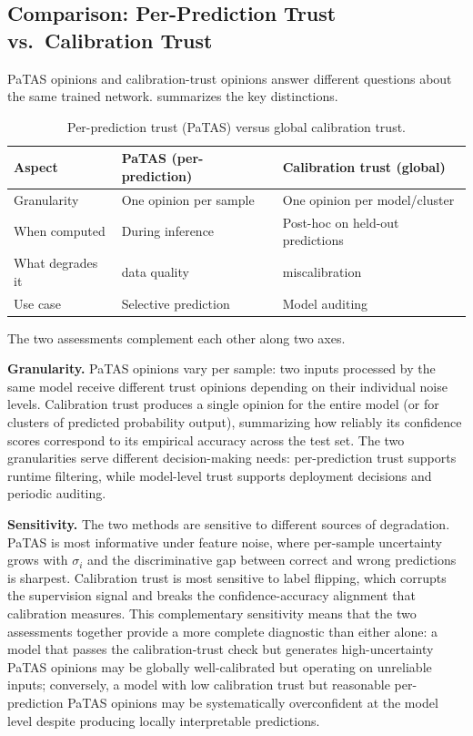 \subsection{Comparison: Per-Prediction Trust vs.\ Calibration Trust}
\label{sec:patas_vs_calibration}
\ac{PaTAS} opinions and calibration-trust opinions answer different questions about the same trained network.  summarizes the key distinctions.

\begin{table}[h]
\centering
\caption{Per-prediction trust (\ac{PaTAS}) versus global calibration trust.}
\label{tab:trust_comparison}
\begin{tabular}{lll}
\toprule
Aspect & \ac{PaTAS} (per-prediction) & Calibration trust (global) \\
\midrule
Granularity       & One opinion per sample      & One opinion per model/cluster \\
When computed     & During inference            & Post-hoc on held-out predictions \\
What degrades it  & data quality               & miscalibration \\
Use case          & Selective prediction        & Model auditing \\
\bottomrule
\end{tabular}
\end{table}

The two assessments complement each other along two axes.

\textbf{Granularity.} \ac{PaTAS} opinions vary per sample: two inputs processed by the same model receive different trust opinions depending on their individual noise levels. Calibration trust produces a single opinion for the entire model (or for clusters of predicted probability output), summarizing how reliably its confidence scores correspond to its empirical accuracy across the test set. The two granularities serve different decision-making needs: per-prediction trust supports runtime filtering, while model-level trust supports deployment decisions and periodic auditing.

\textbf{Sensitivity.} The two methods are sensitive to different sources of degradation. \ac{PaTAS} is most informative under feature noise, where per-sample uncertainty grows with $\sigma_i$ and the discriminative gap between correct and wrong predictions is sharpest. Calibration trust is most sensitive to label flipping, which corrupts the supervision signal and breaks the confidence-accuracy alignment that calibration measures. This complementary sensitivity means that the two assessments together provide a more complete diagnostic than either alone: a model that passes the calibration-trust check but generates high-uncertainty \ac{PaTAS} opinions may be globally well-calibrated but operating on unreliable inputs; conversely, a model with low calibration trust but reasonable per-prediction \ac{PaTAS} opinions may be systematically overconfident at the model level despite producing locally interpretable predictions.

